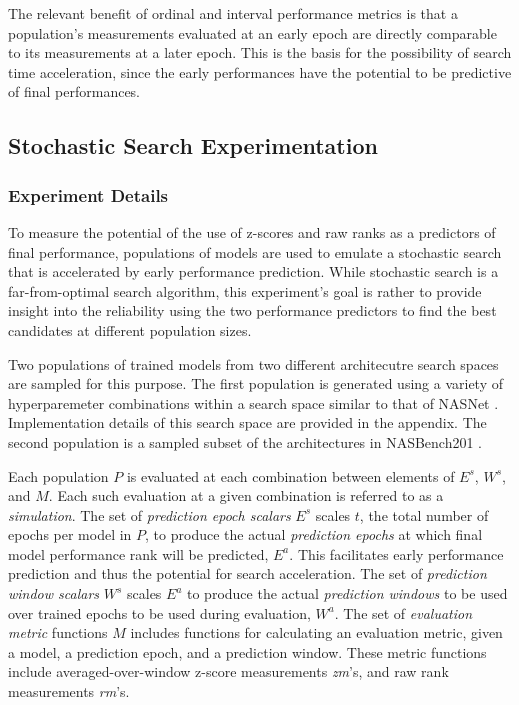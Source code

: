 \documentclass[twocolumn]{article}
\begin{document}
The relevant benefit of ordinal and interval performance metrics is that a population's measurements evaluated at an early epoch are 
directly comparable to its measurements at a later epoch. This is the basis for the possibility of search time acceleration, since
the early performances have the potential to be predictive of final performances.


\subsection{Stochastic Search Experimentation}

\subsubsection{Experiment Details}
To measure the potential of the use of z-scores and raw ranks as a predictors of final performance, populations of models are used to
emulate a stochastic search that is accelerated by early performance prediction. 
While stochastic search is a far-from-optimal search algorithm, this experiment's goal is rather to provide insight into the reliability 
using the two performance predictors to find the best candidates at different population sizes. 

Two populations of trained models from two different architecutre search spaces are sampled for this purpose.
The first population is generated using a variety of hyperparemeter combinations within a search space similar to that of NASNet \cite{nasnet}.
Implementation details of this search space are provided in the appendix. 
The second population is a sampled subset of the architectures in NASBench201 \cite{nasbench201}.

Each population $P$ is evaluated at each combination between elements of $E^s$, $W^s$, and $M$.
Each such evaluation at a given combination is referred to as a \emph{simulation}.
The set of \emph{prediction epoch scalars} $E^s$ scales $t$, the total number of epochs per model in $P$,
to produce the actual \emph{prediction epochs} at which final model performance rank will be predicted, $E^{a}$.
This facilitates early performance prediction and thus the potential for search acceleration.
The set of \emph{prediction window scalars} $W^s$ scales $E^a$ to produce the actual \emph{prediction windows} to be used 
over trained epochs to be used during evaluation, $W^a$.
The set of \emph{evaluation metric} functions $M$ includes functions for calculating an evaluation metric,
given a model, a prediction epoch, and a prediction window. 
These metric functions include averaged-over-window z-score measurements \emph{zm}'s, and raw rank measurements \emph{rm}'s.
\end{document}
